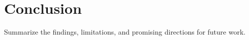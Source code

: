 \section{Conclusion}

Summarize the findings, limitations, and promising directions for future work.
